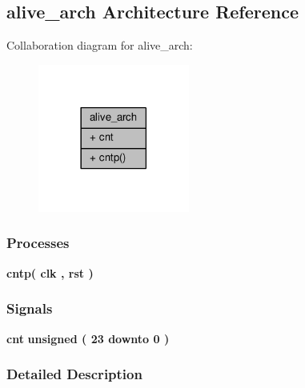 \subsection{alive\+\_\+arch Architecture Reference}
\label{classalive_1_1alive__arch}


Collaboration diagram for alive\+\_\+arch\+:\nopagebreak
\begin{figure}[H]
\begin{center}
\leavevmode
\includegraphics[width=141pt]{d1/d15/classalive_1_1alive__arch__coll__graph}
\end{center}
\end{figure}
\subsubsection*{Processes}
 \begin{DoxyCompactItemize}
\item 
{\bf cntp}{\bfseries  ( {\bfseries {\bfseries {\bf clk}} \textcolor{vhdlchar}{ }} , {\bfseries {\bfseries {\bf rst}} \textcolor{vhdlchar}{ }} )}
\end{DoxyCompactItemize}
\subsubsection*{Signals}
 \begin{DoxyCompactItemize}
\item 
{\bf cnt} {\bfseries \textcolor{comment}{unsigned}\textcolor{vhdlchar}{ }\textcolor{vhdlchar}{(}\textcolor{vhdlchar}{ }\textcolor{vhdlchar}{ } \textcolor{vhdldigit}{23} \textcolor{vhdlchar}{ }\textcolor{keywordflow}{downto}\textcolor{vhdlchar}{ }\textcolor{vhdlchar}{ } \textcolor{vhdldigit}{0} \textcolor{vhdlchar}{ }\textcolor{vhdlchar}{)}\textcolor{vhdlchar}{ }} 
\end{DoxyCompactItemize}


\subsubsection{Detailed Description}


